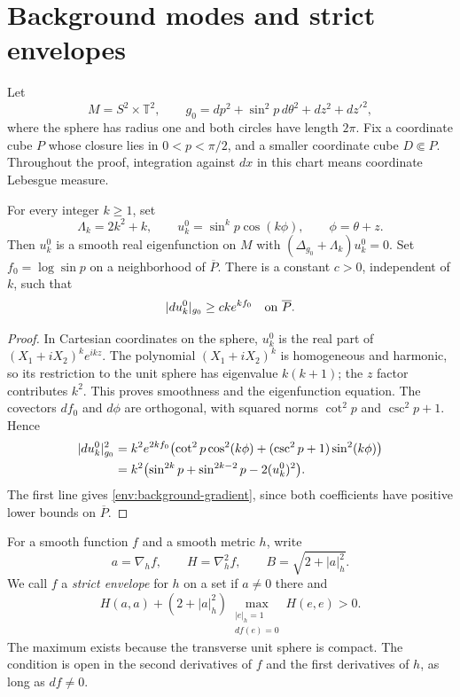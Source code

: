 \section{Background modes and strict envelopes}
\label{sec:envelopes}

Let
\[
 M=S^2\times\mathbb T^2,\qquad
 g_0=dp^2+\sin^2p\,d\theta^2+dz^2+d{z'}^2,
\]
where the sphere has radius one and both circles have length $2\pi$.
Fix a coordinate cube $P$ whose closure lies in $0<p<\pi/2$, and a
smaller coordinate cube $D\Subset P$. Throughout the proof, integration
against $dx$ in this chart means coordinate Lebesgue measure.

\begin{lemma}\label{env:background-mode}
For every integer $k\ge1$, set
\[
 \Lambda_k=2k^2+k,\qquad
 u_k^0=\sin^kp\cos(k\phi),\qquad \phi=\theta+z.
\]
Then $u_k^0$ is a smooth real eigenfunction on $M$ with
$(\Delta_{g_0}+\Lambda_k)u_k^0=0$. Set $f_0=\log\sin p$ on a
neighborhood of $\overline P$. There is a constant $c>0$, independent
of $k$, such that
\begin{equation}\label{env:background-gradient}
 |du_k^0|_{g_0}\ge ck e^{kf_0}\quad\hbox{on }\overline P.
\end{equation}
\end{lemma}

\begin{proof}
In Cartesian coordinates on the sphere, $u_k^0$ is the real part of
$(X_1+iX_2)^ke^{ikz}$. The polynomial $(X_1+iX_2)^k$ is homogeneous
and harmonic, so its restriction to the unit sphere has eigenvalue
$k(k+1)$; the $z$ factor contributes $k^2$. This proves smoothness and
the eigenfunction equation. The covectors $df_0$ and $d\phi$ are
orthogonal, with squared norms $\cot^2p$ and $\csc^2p+1$. Hence
\begin{align}
 |du_k^0|_{g_0}^2
 &=k^2e^{2kf_0}\bigl(\cot^2p\cos^2(k\phi)
                  +(\csc^2p+1)\sin^2(k\phi)\bigr)\notag\\
 &=k^2\bigl(\sin^{2k}p+\sin^{2k-2}p-2(u_k^0)^2\bigr).
 \label{env:background-gradient-identity}
\end{align}
The first line gives \eqref{env:background-gradient}, since both
coefficients have positive lower bounds on $\overline P$.
\end{proof}

For a smooth function $f$ and a smooth metric $h$, write
\[
 a=\nabla_h f,\qquad H=\nabla_h^2f,\qquad
 B=\sqrt{2+|a|_h^2}.
\]
We call $f$ a \emph{strict envelope} for $h$ on a set if $a\ne0$
there and
\begin{equation}\label{env:condition}
 H(a,a)+(2+|a|_h^2)
       \max_{\substack{|e|_h=1\\df(e)=0}}H(e,e)>0.
\end{equation}
The maximum exists because the transverse unit sphere is compact.
The condition is open in the second derivatives of $f$ and the first
derivatives of $h$, as long as $df\ne0$.


